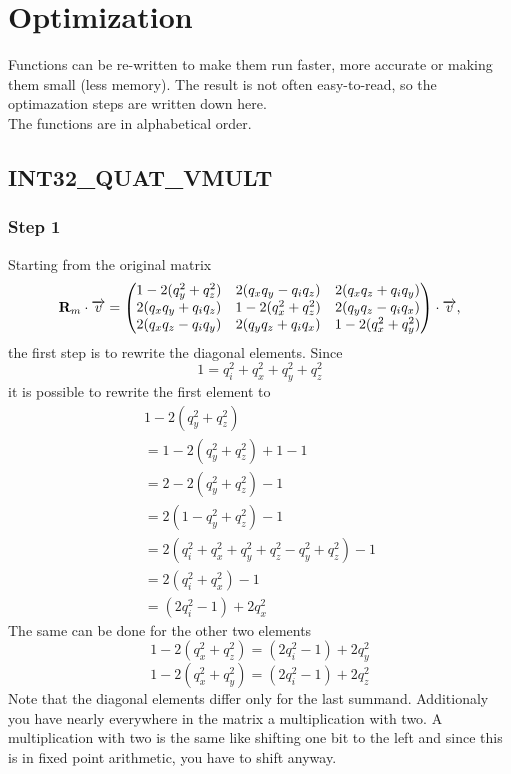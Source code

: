\section{Optimization}
Functions can be re-written to make them run faster, more accurate or making them small (less memory). The result is not often easy-to-read, so the optimazation steps are written down here.\\
The functions are in alphabetical order.

\subsection*{INT32\_QUAT\_VMULT}
\subsubsection*{Step 1}
Starting from the original matrix
\begin{equation}
\mathbf{R}_m \cdot \overrightarrow{v}= \begin{pmatrix}
1-2(q_y^2 + q_z^2)		& 2(q_xq_y-q_iq_z)		& 2(q_xq_z + q_iq_y) \\
2(q_xq_y + q_iq_z)		& 1-2(q_x^2 + q_z^2)	& 2(q_yq_z - q_iq_x) \\
2(q_xq_z - q_iq_y)		& 2(q_yq_z+q_iq_x)		& 1-2(q_x^2 + q_y^2)	
\end{pmatrix} \cdot \overrightarrow{v},
\end{equation}
the first step is to rewrite the diagonal elements. Since
\begin{equation}
1 = q_i^2+q_x^2+q_y^2+q_z^2
\end{equation}
it is possible to rewrite the first element to
\begin{eqnarray}
1-2(q_y^2 + q_z^2) \\
= 1-2(q_y^2 + q_z^2) +1-1 \\
= 2-2(q_y^2 + q_z^2)-1 \\
= 2(1 - q_y^2 + q_z^2)-1 \\
= 2(q_i^2+q_x^2+q_y^2+q_z^2 - q_y^2 + q_z^2)-1 \\
= 2(q_i^2+q_x^2)-1 \\
= (2q_i^2-1)+2q_x^2
\end{eqnarray}
The same can be done for the other two elements
\begin{equation}
1-2(q_x^2 + q_z^2) = (2q_i^2-1)+2q_y^2
\end{equation}
\begin{equation}
1-2(q_x^2 + q_y^2) = (2q_i^2-1)+2q_z^2
\end{equation}
Note that the diagonal elements differ only for the last summand. Additionaly you have nearly everywhere in the matrix a multiplication with two. A multiplication with two is the same like shifting one bit to the left and since this is in fixed point arithmetic, you have to shift anyway.
